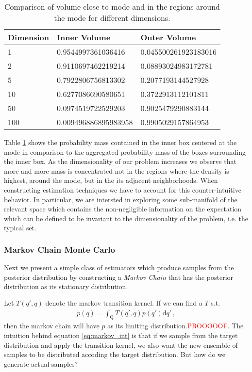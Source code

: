 \begin{table}
\centering
 \begin{tabular}{|l l l|}
 \hline
 Dimension & Inner Volume & Outer Volume \\ [0.5ex]
 \hline\hline
 1 & 0.9544997361036416 & 0.045500261923183016 \\
 2 & 0.9110697462219214 & 0.08893024983172781 \\
 5 & 0.7922806756813302 & 0.2077193144527928 \\
 10 & 0.6277086690580651 & 0.3722913112101811 \\
 50 & 0.0974519722529203 & 0.9025479290883144 \\
 100 & 0.009496886895983958 & 0.9905029157864953 \\ [1ex]
 \hline
 \end{tabular}
 \caption{Comparison of volume close to mode and in the regions around the mode for different dimensions.}
\label{tab:volume}
\end{table}

Table \ref{tab:volume} shows the probability mass contained in the inner box centered
at the mode in comparison to the aggregated probability mass of the boxes surrounding
the inner box. As the dimensionality of our problem increases we observe that more
and more mass is concentrated not in the regions where the density is highest, around the mode,
but in the its adjacent neighborhoods. When constructing estimation techniques we
have to account for this counter-intuitive behavior. In particular, we are intersted in
exploring some sub-manifold of the relevant space which contains the non-negligible
information on the expectation which can be defined to be invariant to the dimensionality of the problem, i.e. the typical set.

\subsubsection{Markov Chain Monte Carlo}
Next we present a simple class of estimators which produce samples from the posterior
distribution by constructing a \emph{Markov Chain} that has the posterior distribution
as its stationary distribution.

Let $T(q', q)$ denote the markov transition kernel. If we can find a $T$ s.t.
\begin{align}
  p(q) = \int_{\mathrm{Q}} T(q', q) p(q') \mathrm{d}q' \,,
  \label{eq:markov_int}
\end{align}
then the markov chain will have $p$ as its limiting distribution.\textcolor{red}{PROOOOOF}.
The intuition behind equation \ref{eq:markov_int} is that if we sample from the
target distribution and apply the transition kernel, we also want the new ensemble of
samples to be distributed accoding the target distribution. But how do we generate
actual samples?



